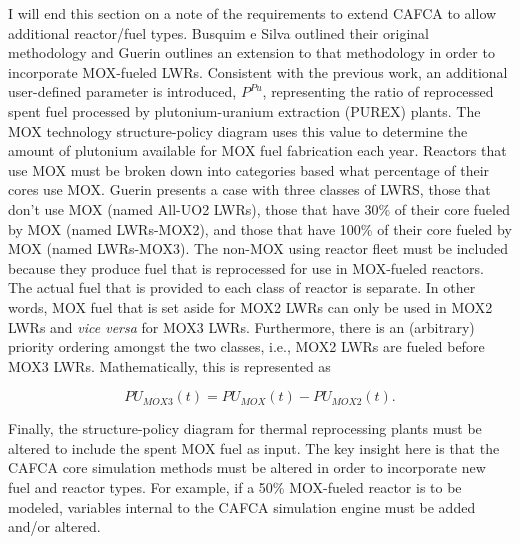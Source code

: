 I will end this section on a note of the requirements to extend CAFCA to allow
additional reactor/fuel types. Busquim e Silva outlined their original
methodology \cite{busquim_e_silva_system_2008} and Guerin outlines an extension
to that methodology\cite{guerin_impact_2009} in order to incorporate MOX-fueled
LWRs. Consistent with the previous work, an additional user-defined parameter is
introduced, $P^{Pu}$, representing the ratio of reprocessed spent fuel processed
by plutonium-uranium extraction (PUREX) plants. The MOX technology
structure-policy diagram uses this value to determine the amount of plutonium
available for MOX fuel fabrication each year. Reactors that use MOX must be
broken down into categories based what percentage of their cores use MOX. Guerin
presents a case with three classes of LWRS, those that don't use MOX (named
All-UO2 LWRs), those that have 30\% of their core fueled by MOX (named
LWRs-MOX2), and those that have 100\% of their core fueled by MOX (named
LWRs-MOX3). The non-MOX using reactor fleet must be included because they
produce fuel that is reprocessed for use in MOX-fueled reactors. The actual fuel
that is provided to each class of reactor is separate. In other words, MOX fuel
that is set aside for MOX2 LWRs can only be used in MOX2 LWRs and \textit{vice
versa} for MOX3 LWRs. Furthermore, there is an (arbitrary) priority ordering
amongst the two classes, i.e., MOX2 LWRs are fueled before MOX3
LWRs. Mathematically, this is represented as

\begin{equation}
PU_{MOX3}(t) = PU_{MOX}(t) - PU_{MOX2}(t).
\end{equation}

Finally, the structure-policy diagram for thermal reprocessing plants must be
altered to include the spent MOX fuel as input. The key insight here is that the
CAFCA core simulation methods must be altered in order to incorporate new fuel
and reactor types. For example, if a 50\% MOX-fueled reactor is to be modeled,
variables internal to the CAFCA simulation engine must be added and/or altered. 
